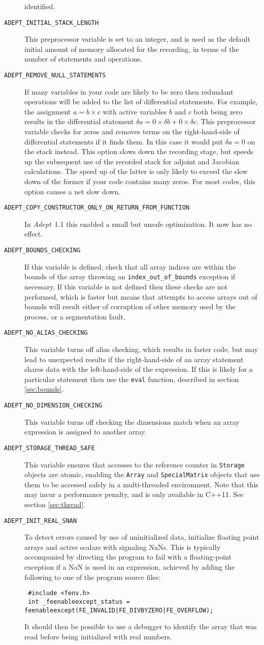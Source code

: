 \documentclass[a4,oneside]{book}
\def\codesize{\small}
\def\Adept{\emph{Adept}}
\def\code#1{{\codesize\texttt{#1}}}
\def\citem#1{\item[{\codesize\texttt{#1}}]}
\begin{document}
\begin{description}
identified.
%
\citem{ADEPT\_INITIAL\_STACK\_LENGTH} This preprocessor variable is
set to an integer, and is used as the default initial amount of memory
allocated for the recording, in terms of the number of statements and
operations.
%
\citem{ADEPT\_REMOVE\_NULL\_STATEMENTS} If many variables in your code
are likely to be zero then redundant operations will be added to the
list of differential statements. For example, the assignment
$a=b\times c$ with active variables $b$ and $c$ both being zero
results in the differential statement $\delta a=0\times\delta
b+0\times\delta c$. This preprocessor variable checks for zeros and
removes terms on the right-hand-side of differential statements if it
finds them. In this case it would put $\delta a=0$ on the stack
instead. This option slows down the recording stage, but speeds up the
subsequent use of the recorded stack for adjoint and Jacobian
calculations. The speed up of the latter is only likely to exceed the
slow down of the former if your code contains many zeros. For most
codes, this option causes a net slow down.
%
\citem{ADEPT\_COPY\_CONSTRUCTOR\_ONLY\_ON\_RETURN\_FROM\_FUNCTION} In
\Adept\ 1.1 this enabled a small but unsafe optimization. It now has
no effect.
%
\citem{ADEPT\_BOUNDS\_CHECKING} If this variable is defined, check
that all array indices are within the bounds of the array throwing an
\code{index\_out\_of\_bounds} exception if necessary.  If this
variable is not defined then these checks are not performed, which is
faster but means that attempts to access arrays out of bounds will
result either of corruption of other memory used by the process, or a
segmentation fault. 
\citem{ADEPT\_NO\_ALIAS\_CHECKING} This variable turns off alias
checking, which results in faster code, but may lead to unexpected
results if the right-hand-side of an array statement shares data with
the left-hand-side of the expression. If this is likely for a
particular statement then use the \code{eval} function, described in
section \ref{sec:bounds}.
\citem{ADEPT\_NO\_DIMENSION\_CHECKING} This variable turns off
checking the dimensions match when an array expression is assigned to
another array.
\citem{ADEPT\_STORAGE\_THREAD\_SAFE} This variable ensures that
accesses to the reference counter in \code{Storage} objects are
atomic, enabling the \code{Array} and \code{SpecialMatrix} objects
that use them to be accessed safely in a multi-threaded
environment. Note that this may incur a performance penalty, and is
only available in C++11. See section \ref{sec:thread}.
\citem{ADEPT\_INIT\_REAL\_SNAN} To detect errors caused by use of
uninitialized data, initialize floating point arrays and active
scalars with signaling NaNs.  This is typically accompanied by
directing the program to fail with a floating-point exception if a NaN
is used in an expression, achieved by adding the following to one of
the program source files:
\begin{lstlisting}
 #include <fenv.h>
 int _feenableexcept_status = feenableexcept(FE_INVALID|FE_DIVBYZERO|FE_OVERFLOW);
\end{lstlisting}
It should then be possible to use a debugger to identify the array
that was read before being initialized with real numbers.
\end{description}
\end{document}
